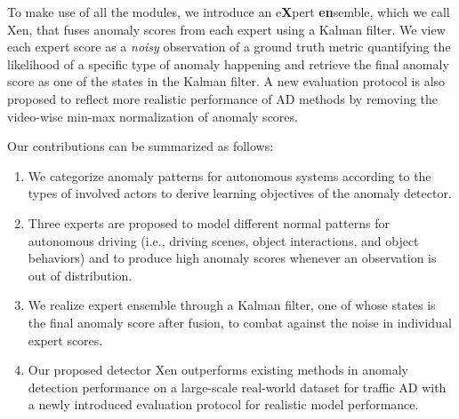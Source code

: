 To make use of all the modules, we introduce an e\textbf{X}pert \textbf{en}semble, which we call Xen, that fuses anomaly scores from each expert using a Kalman filter. We view each expert score as a \textit{noisy} observation of a ground truth metric quantifying the likelihood of a specific type of anomaly happening and retrieve the final anomaly score as one of the states in the Kalman filter. A new evaluation protocol is also proposed to reflect more realistic performance of AD methods by removing the video-wise min-max normalization of anomaly scores.

Our contributions can be summarized as follows:
\begin{enumerate}
\item
We categorize anomaly patterns for autonomous systems according to the types of involved actors to derive learning objectives of the anomaly detector.
\item
Three experts are proposed to model different normal patterns for autonomous driving (i.e., driving scenes, object interactions, and object behaviors) and to produce high anomaly scores whenever an observation is out of distribution.
\item
We realize expert ensemble through a Kalman filter, one of whose states is the final anomaly score after fusion, to combat against the noise in individual expert scores.
\item
Our proposed detector Xen outperforms existing methods in anomaly detection performance on a large-scale real-world dataset for traffic AD with a newly introduced evaluation protocol for realistic model performance.
\end{enumerate}